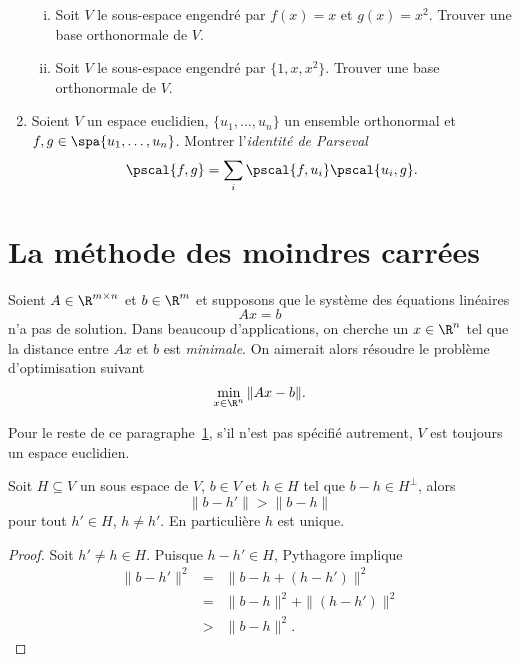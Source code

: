 \begin{enumerate}
\begin{enumerate}[i)]
  \item Soit $V$ le sous-espace engendré par $f(x) = x$ et $g(x) = x^2$. Trouver une base orthonormale de $V$. 
  \item Soit $V$ le sous-espace engendré par $\{1,x,x^2\}$. Trouver une base orthonormale de $V$. 
  \end{enumerate}
\item Soient $V$ un espace euclidien, $\{u_1,\dots,u_n\}$ un ensemble orthonormal et $f,g \in \spa\{u_1,\dots,u_n\}$. Montrer l'\emph{identité de Parseval}
  \begin{displaymath}
    \pscal{f,g} = \sum_i \pscal{f,u_i}\pscal{u_i,g}. 
  \end{displaymath}
\end{enumerate}


\section{La méthode des moindres carrées} 
\label{sec:le-methode-des}

Soient $A \in \R^{m \times n} $ et $b \in \R^m$ et supposons  que le système des équations linéaires 
\begin{equation}
  \label{eq:2}
  Ax = b
\end{equation}
n'a pas de solution. Dans beaucoup d'applications, on cherche un $x \in \R^n$ tel que la distance entre  $Ax$ et $b$ est \emph{minimale}. On aimerait alors résoudre le problème d'optimisation suivant
\begin{equation}
  \label{eq:3}
  \min_{x \in \R^n} \|Ax - b\|. 
\end{equation}

\begin{framed}\noindent 
  Pour le reste de ce paragraphe~\ref{sec:le-methode-des}, s'il n'est pas spécifié autrement, $V$ est toujours un espace euclidien.
\end{framed} 


\begin{lemma}
  \label{lem:26}
  Soit $H ⊆ V$ un sous espace de $V$, $b ∈ V$ et $h ∈ H$ tel que $b-h ∈ H^⊥$, alors
  \begin{displaymath}
    \|b- h' \| >  \|b-h\| 
  \end{displaymath}
  pour tout $h' ∈ H$, $h ≠ h'$. En particulière $h$ est unique. 
\end{lemma}

\begin{proof}
  Soit $h' ≠ h ∈ H$. Puisque $h - h' ∈ H$, Pythagore  implique 
  \begin{eqnarray*}
    \| b - h' \|^2 & = & \| b - h + ( h- h') \|^2 \\
                   & = & \| b - h\| ^2  + \| ( h- h') \|^2\\ 
                   & > &       \| b - h\| ^2. 
  \end{eqnarray*}
  
\end{proof}

